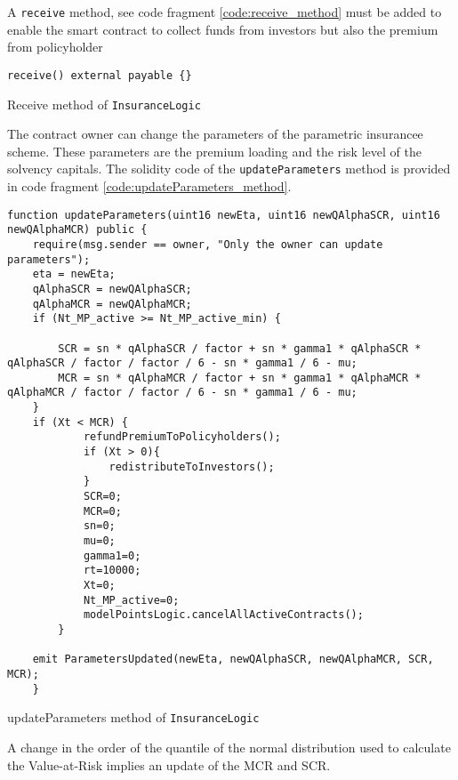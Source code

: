 \documentclass[10pt]{article}
\begin{document}
A \texttt{receive} method, see code fragment \ref{code:receive_method} must be added to enable the smart contract to collect funds from investors but also the premium from policyholder

\begin{codefragment}[!h]
\begin{lstlisting}[language=Solidity]
receive() external payable {}
    \end{lstlisting}
    \caption{Receive method of \texttt{InsuranceLogic}}
    \label{code:receive_method}
\end{codefragment}

The contract owner can change the parameters of the parametric insurancee scheme. These parameters are the premium loading and the risk level of the solvency capitals. The solidity code of the \texttt{updateParameters} method is provided in code fragment \ref{code:updateParameters_method}.


\begin{codefragment}[!h]
\begin{lstlisting}[language=Solidity]
function updateParameters(uint16 newEta, uint16 newQAlphaSCR, uint16 newQAlphaMCR) public {
    require(msg.sender == owner, "Only the owner can update parameters");
    eta = newEta;
    qAlphaSCR = newQAlphaSCR;
    qAlphaMCR = newQAlphaMCR;
    if (Nt_MP_active >= Nt_MP_active_min) {

        SCR = sn * qAlphaSCR / factor + sn * gamma1 * qAlphaSCR * qAlphaSCR / factor / factor / 6 - sn * gamma1 / 6 - mu;
        MCR = sn * qAlphaMCR / factor + sn * gamma1 * qAlphaMCR * qAlphaMCR / factor / factor / 6 - sn * gamma1 / 6 - mu;
    }
    if (Xt < MCR) {
            refundPremiumToPolicyholders();
            if (Xt > 0){
                redistributeToInvestors();
            }
            SCR=0;
            MCR=0;
            sn=0;
            mu=0;
            gamma1=0;
            rt=10000;
            Xt=0;
            Nt_MP_active=0;
            modelPointsLogic.cancelAllActiveContracts();
        }

    emit ParametersUpdated(newEta, newQAlphaSCR, newQAlphaMCR, SCR, MCR);
    }
        \end{lstlisting}
    \caption{updateParameters method of \texttt{InsuranceLogic}}
    \label{code:updateParameters_method}
\end{codefragment}

A change in the order of the quantile of the normal distribution used to calculate the Value-at-Risk implies an update of the MCR and SCR. \\
\end{document}
